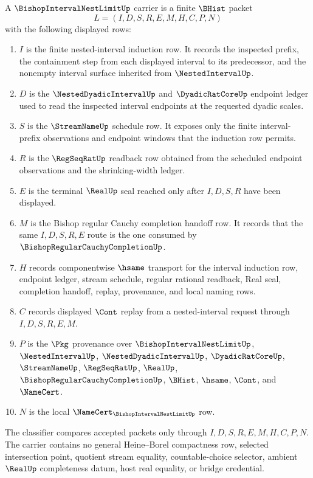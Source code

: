 \begin{definition}
\label{def:bishop-interval-nest-limit-carrier}
A $\BishopIntervalNestLimitUp$ carrier is a finite $\BHist$ packet
$$
L=(I,D,S,R,E,M,H,C,P,N)
$$
with the following displayed rows:
\begin{enumerate}
\item $I$ is the finite nested-interval induction row. It records the inspected prefix, the containment step from each displayed interval to its predecessor, and the nonempty interval surface inherited from $\NestedIntervalUp$.
\item $D$ is the $\NestedDyadicIntervalUp$ and $\DyadicRatCoreUp$ endpoint ledger used to read the inspected interval endpoints at the requested dyadic scales.
\item $S$ is the $\StreamNameUp$ schedule row. It exposes only the finite interval-prefix observations and endpoint windows that the induction row permits.
\item $R$ is the $\RegSeqRatUp$ readback row obtained from the scheduled endpoint observations and the shrinking-width ledger.
\item $E$ is the terminal $\RealUp$ seal reached only after $I,D,S,R$ have been displayed.
\item $M$ is the Bishop regular Cauchy completion handoff row. It records that the same $I,D,S,R,E$ route is the one consumed by $\BishopRegularCauchyCompletionUp$.
\item $H$ records componentwise $\hsame$ transport for the interval induction row, endpoint ledger, stream schedule, regular rational readback, Real seal, completion handoff, replay, provenance, and local naming rows.
\item $C$ records displayed $\Cont$ replay from a nested-interval request through $I,D,S,R,E,M$.
\item $P$ is the $\Pkg$ provenance over $\BishopIntervalNestLimitUp$, $\NestedIntervalUp$, $\NestedDyadicIntervalUp$, $\DyadicRatCoreUp$, $\StreamNameUp$, $\RegSeqRatUp$, $\RealUp$, $\BishopRegularCauchyCompletionUp$, $\BHist$, $\hsame$, $\Cont$, and $\NameCert$.
\item $N$ is the local $\NameCert_{\BishopIntervalNestLimitUp}$ row.
\end{enumerate}
The classifier compares accepted packets only through $I,D,S,R,E,M,H,C,P,N$. The carrier contains no general Heine--Borel compactness row, selected intersection point, quotient stream equality, countable-choice selector, ambient $\RealUp$ completeness datum, host real equality, or bridge credential.
\end{definition}

